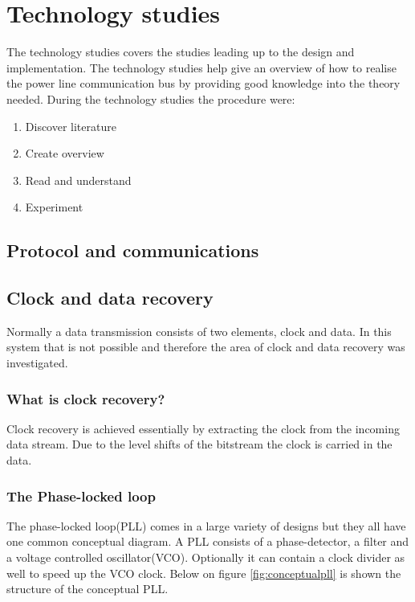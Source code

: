 \chapter{Technology studies}

The technology studies covers the studies leading up to the design and implementation. The technology studies help give an overview of how to realise the power line communication bus by providing good knowledge into the theory needed. During the technology studies the procedure were:
\begin{enumerate}
\item Discover literature
\item Create overview
\item Read and understand
\item Experiment
\end{enumerate}


\section{Protocol and communications}


\section{Clock and data recovery}
Normally a data transmission consists of two elements, clock and data. In this system that is not possible and therefore the area of clock and data recovery was investigated.

\subsection{What is clock recovery?}
Clock recovery is achieved essentially by extracting the clock from the incoming data stream. Due to the level shifts of the bitstream the clock is carried in the data.

\subsection{The Phase-locked loop}
The phase-locked loop(PLL) comes in a large variety of designs but they all have one common conceptual diagram. A PLL consists of a phase-detector, a filter and a voltage controlled oscillator(VCO). Optionally it can contain a clock divider as well to speed up the VCO clock. Below on figure \ref{fig:conceptualpll} is shown the structure of the conceptual PLL.

